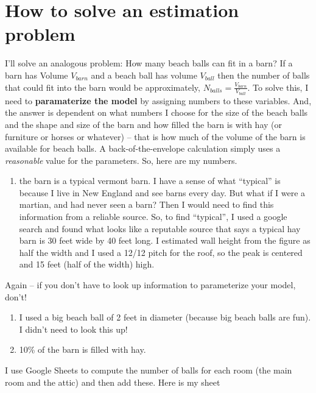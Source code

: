 \documentclass[]{book}
\providecommand{\tightlist}{%
  \setlength{\itemsep}{0pt}\setlength{\parskip}{0pt}}
\begin{document}
\section{How to solve an estimation
problem}\label{how-to-solve-an-estimation-problem}

I'll solve an analogous problem: How many beach balls can fit in a barn?
If a barn has Volume \(V_{barn}\) and a beach ball has volume
\(V_{ball}\) then the number of balls that could fit into the barn would
be approximately, \(N_{balls} = \frac{V_{barn}}{V_{ball}}\). To solve
this, I need to \textbf{paramaterize the model} by assigning numbers to
these variables. And, the answer is dependent on what numbers I choose
for the size of the beach balls and the shape and size of the barn and
how filled the barn is with hay (or furniture or horses or whatever) --
that is how much of the volume of the barn is available for beach balls.
A back-of-the-envelope calculation simply uses a \emph{reasonable} value
for the parameters. So, here are my numbers.

\begin{enumerate}
\def\labelenumi{\arabic{enumi}.}
\tightlist
\item
  the barn is a typical vermont barn. I have a sense of what ``typical''
  is because I live in New England and see barns every day. But what if
  I were a martian, and had never seen a barn? Then I would need to find
  this information from a reliable source. So, to find ``typical'', I
  used a google search and found what looks like a reputable source that
  says a typical hay barn is 30 feet wide by 40 feet long. I estimated
  wall height from the figure as half the width and I used a 12/12 pitch
  for the roof, so the peak is centered and 15 feet (half of the width)
  high.
\end{enumerate}

Again -- if you don't have to look up information to parameterize your
model, don't!

\begin{enumerate}
\def\labelenumi{\arabic{enumi}.}
\setcounter{enumi}{1}
\item
  I used a big beach ball of 2 feet in diameter (because big beach balls
  are fun). I didn't need to look this up!
\item
  10\% of the barn is filled with hay.
\end{enumerate}

I use Google Sheets to compute the number of balls for each room (the
main room and the attic) and then add these. Here is my sheet
\end{document}

